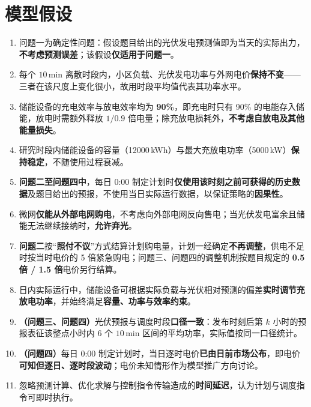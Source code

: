 \section{模型假设}
\begin{enumerate}[label=(\arabic*), leftmargin=2.5em, itemsep=0.3em]
\item 问题一为确定性问题：假设题目给出的光伏发电预测值即为当天的实际出力，\textbf{不考虑预测误差}；该假设\textbf{仅适用于问题一}。
\item 每个 $10\,$min 离散时段内，小区负载、光伏发电功率与外网电价\textbf{保持不变}——三者在该尺度上变化很小，故用时段平均值代表其功率水平。
\item 储能设备的充电效率与放电效率均为 \textbf{90\%}，即充电时只有 90\% 的电能存入储能，放电时需额外释放 $1/0.9$ 倍电量；除充放电损耗外，\textbf{不考虑自放电及其他能量损失}。
\item 研究时段内储能设备的容量（12000\,kWh）与最大充放电功率（5000\,kW）\textbf{保持稳定}，不随使用过程衰减。
\item \textbf{问题二至问题四中}，每日 0:00 制定计划时\textbf{仅使用该时刻之前可获得的历史数据}及题目给出的预报，不使用当日实际运行数据，以保证策略的\textbf{因果性}。
\item 微网\textbf{仅能从外部电网购电}，不考虑向外部电网反向售电；当光伏发电富余且储能无法继续接纳时，\textbf{允许弃光}。
\item \textbf{问题二}按“\textbf{照付不议}”方式结算计划购电量，计划一经确定\textbf{不再调整}，供电不足时按当时电价的 5 倍紧急购电；问题三、问题四的调整机制按题目规定的 \textbf{0.5 倍 / 1.5 倍}电价另行结算。
\item 日内实际运行中，储能设备可根据实际负载与光伏相对预测的偏差\textbf{实时调节充放电功率}，并始终满足\textbf{容量、功率与效率约束}。
\item \textbf{（问题三、问题四）}光伏预报与调度时段\textbf{口径一致}：发布时刻后第 $k$ 小时的预报表征该整点小时内 6 个 $10\,$min 区间的平均功率，实际值按同一口径统计。
\item \textbf{（问题四）}每日 0:00 制定计划时，当日逐时电价\textbf{已由日前市场公布}，即电价\textbf{可知但逐日、逐时段波动}；电价未知情形作为模型推广方向讨论。
\item 忽略预测计算、优化求解与控制指令传输造成的\textbf{时间延迟}，认为计划与调度指令可即时执行。
\end{enumerate}
